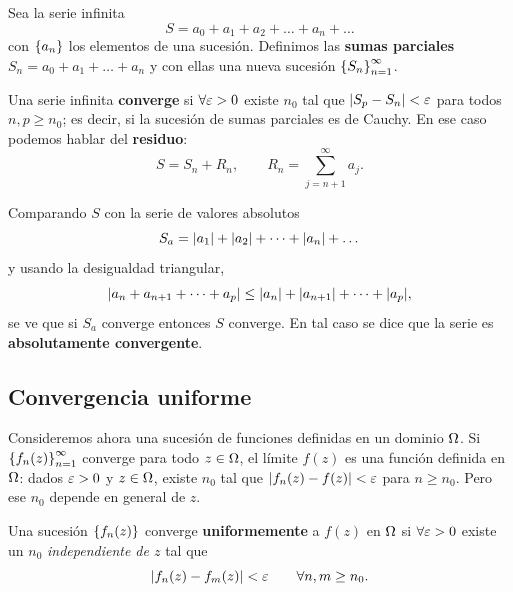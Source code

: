 Sea la serie infinita
\begin{equation}
  \label{eq:serie}
  S=a_0+a_1+a_2+\dots+a_n+\dots
\end{equation}
con $\left\{ a_n \right\}$ los elementos de una sucesi\'on. Definimos las
\textbf{sumas parciales} $S_n=a_0+a_1+\dots+a_n$ y con ellas una nueva
sucesi\'on $\left\{ S_n \right\}_{n=1}^{\infty}$.

Una serie infinita \textbf{converge} si $\forall\varepsilon>0$ existe $n_0$ tal que
$\lvert S_p-S_n \rvert<\varepsilon$ para todos $n,p\ge n_0$; es decir, si la sucesi\'on de
sumas parciales es de Cauchy. En ese caso podemos hablar del
\textbf{residuo}:
\begin{equation}
  \label{eq:residuo}
  S=S_n+R_n,
  \qquad
  R_n=\sum_{j=n+1}^{\infty}a_j .
\end{equation}

Comparando $S$ con la serie de valores absolutos
\begin{equation}
  \label{eq:serie_absoluta}
  S_a=\lvert a_1 \rvert+\lvert a_2 \rvert+\dots+\lvert a_n \rvert+\dots
\end{equation}
y usando la desigualdad triangular,
\begin{equation}
  \label{eq:desigualdad_triangular_serie}
  \lvert a_n+a_{n+1}+\dots+a_p \rvert
    \le\lvert a_n \rvert+\lvert a_{n+1} \rvert+\dots+\lvert a_p \rvert,
\end{equation}
se ve que si $S_a$ converge entonces $S$ converge. En tal caso se dice que la
serie es \textbf{absolutamente convergente}.

\subsection{Convergencia uniforme}
\label{subsec:convergencia_uniforme}

Consideremos ahora una sucesi\'on de funciones definidas en un dominio $\Omega$.
Si $\left\{ f_n(z) \right\}_{n=1}^{\infty}$ converge para todo $z\in\Omega$, el l\'imite
$f(z)$ es una funci\'on definida en $\Omega$: dados $\varepsilon>0$ y $z\in\Omega$, existe
$n_0$ tal que $\lvert f_n(z)-f(z) \rvert<\varepsilon$ para $n\ge n_0$. Pero ese $n_0$ depende
en general de $z$.

\begin{definicion}
  \label{def:convergencia_uniforme}
  Una sucesi\'on $\left\{ f_n(z) \right\}$ converge \textbf{uniformemente} a $f(z)$ en
  $\Omega$ si $\forall\varepsilon>0$ existe un $n_0$ \emph{independiente de $z$} tal que
  \begin{equation}
    \label{eq:convergencia_uniforme}
    \lvert f_n(z)-f_m(z) \rvert<\varepsilon
    \qquad\forall n,m\ge n_0 .
  \end{equation}
\end{definicion}

